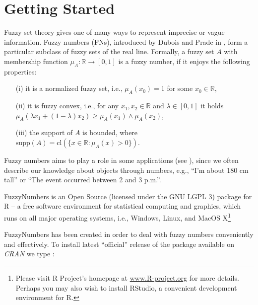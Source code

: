 \documentclass[11pt]{article}\usepackage[]{graphicx}\usepackage[]{color}
\newcommand{\package}[1]{\textsf{#1}\xspace}
\newcommand{\program}[1]{\textsf{#1}\xspace}
\newcommand{\os}[1]{\textsf{#1}\xspace}
\newcommand{\lang}[1]{\textsf{#1}\xspace}
\newcommand{\R}{\lang{R}}
\newif\ifDevelopmentVersion
\begin{document}
\section{Getting Started}

Fuzzy set theory gives one of many ways to represent
imprecise or vague information. Fuzzy numbers (FNs), introduced
by Dubois and Prade in \cite{DuboisPrade1978:opfn}, form a particular
subclass of fuzzy sets of the real line.
Formally, a fuzzy set $A$
with membership function $\mu_A:\mathbb{R}\to[0,1]$
is a fuzzy number, if it enjoys the following properties:
\begin{itemize}
\item[(i)] it is a normalized fuzzy set,
i.e., $\mu_A(x_0)=1$ for some $x_0\in\mathbb{R}$,
\item[(ii)] it is fuzzy convex, i.e., for any $x_1,x_2\in\mathbb{R}$
and $\lambda\in[0,1]$ it holds
$\mu_A(\lambda x_1 + (1-\lambda) x_2) \ge \mu_A(x_1)\wedge \mu_A(x_2)$,
\item[(iii)] the support of $A$ is bounded,
where $\mathrm{supp}(A) = \mathrm{cl}(\{x\in\mathbb{R}: \mu_A(x)>0\})$.
\end{itemize}
Fuzzy numbers aims to play a role in some applications
(see \cite{KlirYuan1995:fuzzybook}),
since we often describe our knowledge about objects
through numbers, e.g., ``I'm about 180 cm tall''
or ``The event occurred between 2 and 3 p.m.''.




\bigskip
\package{FuzzyNumbers} is an Open Source (licensed under the GNU LGPL 3)
package for \R{} -- a free software environment
for statistical computing and graphics, which
runs on all major operating systems, i.e., \os{Windows},
\os{Linux}, and \os{MacOS X}\footnote{%
Please visit \R{} Project's homepage at \href{http://www.R-project.org}{www.R-project.org}
for more details.
Perhaps you may also wish to install  \program{RStudio},
a convenient development environment for \R.}


\package{FuzzyNumbers} has been created in order to deal with fuzzy numbers
conveniently and effectively.
To install latest ``official'' release of the
package available on \textit{CRAN} we type%
\ifDevelopmentVersion%
\footnote{You are viewing the \textbf{development} version of the tutorial.
Some of the features presented in this document may be missing
in the current \textit{CRAN} release. Please, upgrade to the \textbf{latest} development version from
\href{https://github.com/gagolews/FuzzyNumbers}{\textit{GitHub}}
if you need the new functionality.}\ignorespaces
\fi%
:
\end{document}
